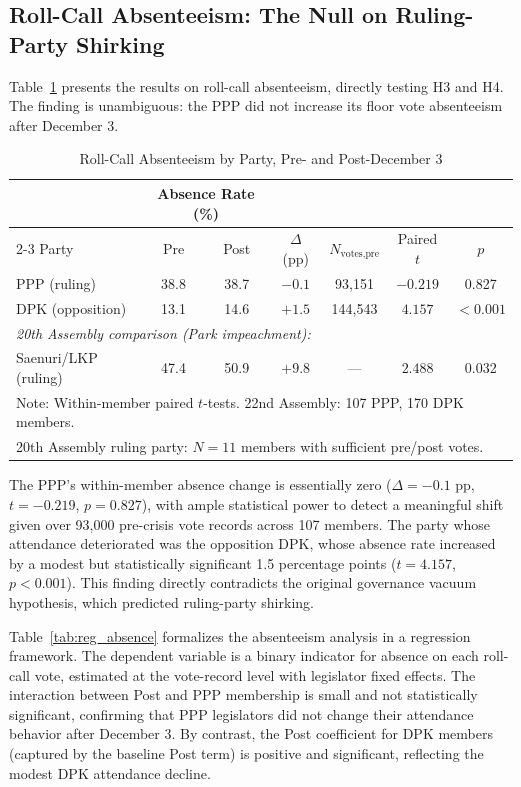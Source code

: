 \documentclass[11pt]{article}
\begin{document}
\subsection{Roll-Call Absenteeism: The Null on Ruling-Party Shirking}

Table~\ref{tab:absence} presents the results on roll-call absenteeism, directly testing H3 and H4. The finding is unambiguous: the PPP did not increase its floor vote absenteeism after December 3.

\begin{table}[htbp]
\centering
\caption{Roll-Call Absenteeism by Party, Pre- and Post-December 3}
\label{tab:absence}
\begin{tabular}{lcccccc}
\toprule
 & \multicolumn{2}{c}{Absence Rate (\%)} & & & & \\
\cmidrule(lr){2-3}
Party & Pre & Post & $\Delta$ (pp) & $N_{\text{votes,pre}}$ & Paired $t$ & $p$ \\
\midrule
PPP (ruling) & 38.8 & 38.7 & $-0.1$ & 93,151 & $-0.219$ & 0.827 \\
DPK (opposition) & 13.1 & 14.6 & $+1.5$ & 144,543 & $4.157$ & $<0.001$ \\
\midrule
\multicolumn{7}{l}{\textit{20th Assembly comparison (Park impeachment):}} \\
Saenuri/LKP (ruling) & 47.4 & 50.9 & $+9.8$ & --- & $2.488$ & 0.032 \\
\bottomrule
\multicolumn{7}{l}{\footnotesize Note: Within-member paired $t$-tests. 22nd Assembly: 107 PPP, 170 DPK members.} \\
\multicolumn{7}{l}{\footnotesize 20th Assembly ruling party: $N = 11$ members with sufficient pre/post votes.}
\end{tabular}
\end{table}

The PPP's within-member absence change is essentially zero ($\Delta = -0.1$ pp, $t = -0.219$, $p = 0.827$), with ample statistical power to detect a meaningful shift given over 93,000 pre-crisis vote records across 107 members. The party whose attendance deteriorated was the opposition DPK, whose absence rate increased by a modest but statistically significant 1.5 percentage points ($t = 4.157$, $p < 0.001$). This finding directly contradicts the original governance vacuum hypothesis, which predicted ruling-party shirking.

Table~\ref{tab:reg_absence} formalizes the absenteeism analysis in a regression framework. The dependent variable is a binary indicator for absence on each roll-call vote, estimated at the vote-record level with legislator fixed effects. The interaction between Post and PPP membership is small and not statistically significant, confirming that PPP legislators did not change their attendance behavior after December 3. By contrast, the Post coefficient for DPK members (captured by the baseline Post term) is positive and significant, reflecting the modest DPK attendance decline.
\end{document}
